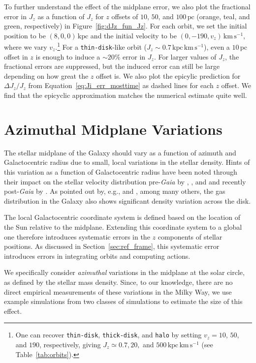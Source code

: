 \documentclass[twocolumn]{aastex62}
\newcommand{\pc}{\text{pc}}
\newcommand{\kpc}{\text{kpc}}
\newcommand{\kms}{\text{km}\,\text{s}^{-1}}
\newcommand{\actunit}{\text{kpc}\,\kms}
\newcommand{\thin}{\texttt{thin-disk}}
\newcommand{\thick}{\texttt{thick-disk}}
\newcommand{\halo}{\texttt{halo}}
\begin{document}
To further understand the effect of the midplane error, we also plot the
fractional error in $J_z$ as a function of $J_z$ for $z$ offsets of $10$,
$50$, and $ 100\,\pc$ (orange, teal, and green, respectively) in
Figure~\ref{fig:dJz_fun_Jz}. For each orbit, we set the initial position to be
$(8,0,0)\,\kpc$ and the initial velocity to be $(0, -190, v_z)\,\kms$, where
we vary $v_z$.\footnote{\label{note:vz_orbits}One can recover \thin{},
\thick{}, and \halo{} by setting $v_z=10$, $50$, and $190$, respectively,
giving $J_z \simeq 0.7, 20,$ and $500\,\actunit$ (see
Table~\ref{tab:orbits}).} For a \thin{}-like orbit ($J_z\sim0.7\,\actunit$),
even a $10\,\pc$ offset in $z$ is enough to induce a $\sim20\%$ error in
$J_z$. For larger values of $J_z$, the fractional errors are suppressed, but
the induced error can still be large depending on how great the $z$ offset is.
We also plot the epicylic prediction for $\Delta J_z / J_z$ from
Equation~\eqref{eq:Ji_err_mosttime} as dashed lines for each $z$ offset. We
find that the epicyclic approximation matches the numerical estimate quite
well.

\section{Azimuthal Midplane Variations}
\label{sec:local_fire}

The stellar midplane of the Galaxy should vary as a function of azimuth and
Galactocentric radius due to small, local variations in the stellar density.
Hints of this variation as a function of Galactocentric radius have been noted
through their impact on the stellar velocity distribution pre-\textit{Gaia} by
\citet{2012ApJ...750L..41W}, \citet{2013ApJ...777L...5C}, and
\citet{2013MNRAS.436..101W} and recently post-\textit{Gaia} by
\citet{2019arXiv190209569F}. As pointed out by, e.g.,
\citet{2014ApJ...797...53G} and \citet{2019ApJ...871..145A}, among many
others, the gas distribution in the Galaxy also shows significant density
variation across the disk.

The local Galactocentric coordinate system is defined based on the location of
the Sun relative to the midplane. Extending this coordinate system to a global
one therefore introduces systematic errors in the $z$ components of stellar
positions. As discussed in Section~\ref{sec:ref_frame}, this systematic error
introduces errors in integrating orbits and computing actions.

We specifically consider \emph{azimuthal} variations in the midplane at the
solar circle, as defined by the stellar mass density. Since, to our knowledge,
there are no direct empirical measurements of these variations in the Milky
Way, we use example simulations from two classes of simulations to estimate
the size of this effect.
\end{document}
